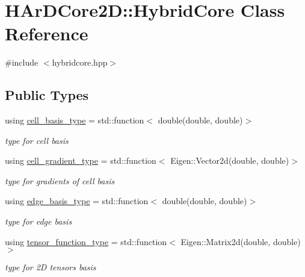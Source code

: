 \hypertarget{classHArDCore2D_1_1HybridCore}{}\section{H\+Ar\+D\+Core2D\+:\+:Hybrid\+Core Class Reference}
\label{classHArDCore2D_1_1HybridCore}


{\ttfamily \#include $<$hybridcore.\+hpp$>$}

\subsection*{Public Types}
\begin{DoxyCompactItemize}
\item 
\mbox{\label{classHArDCore2D_1_1HybridCore_a4b9c53f6ec13dc9e73f5cdc5c8ae782b}} 
using \hyperlink{classHArDCore2D_1_1HybridCore_a4b9c53f6ec13dc9e73f5cdc5c8ae782b}{cell\+\_\+basis\+\_\+type} = std\+::function$<$ double(double, double)$>$
\begin{DoxyCompactList}\small\item\em type for cell basis \end{DoxyCompactList}\item 
\mbox{\label{classHArDCore2D_1_1HybridCore_a41350d7c3ac5a5a5e932348d2c9d0750}} 
using \hyperlink{classHArDCore2D_1_1HybridCore_a41350d7c3ac5a5a5e932348d2c9d0750}{cell\+\_\+gradient\+\_\+type} = std\+::function$<$ Eigen\+::\+Vector2d(double, double)$>$
\begin{DoxyCompactList}\small\item\em type for gradients of cell basis \end{DoxyCompactList}\item 
\mbox{\label{classHArDCore2D_1_1HybridCore_a9e3231c1356e797daaa3476ff1fa4154}} 
using \hyperlink{classHArDCore2D_1_1HybridCore_a9e3231c1356e797daaa3476ff1fa4154}{edge\+\_\+basis\+\_\+type} = std\+::function$<$ double(double, double)$>$
\begin{DoxyCompactList}\small\item\em type for edge basis \end{DoxyCompactList}\item 
\mbox{\label{classHArDCore2D_1_1HybridCore_ad9a6cc8ee2f9d26c936c5c61c358b538}} 
using \hyperlink{classHArDCore2D_1_1HybridCore_ad9a6cc8ee2f9d26c936c5c61c358b538}{tensor\+\_\+function\+\_\+type} = std\+::function$<$ Eigen\+::\+Matrix2d(double, double)$>$
\begin{DoxyCompactList}\small\item\em type for 2D tensors basis \end{DoxyCompactList}\end{DoxyCompactItemize}
